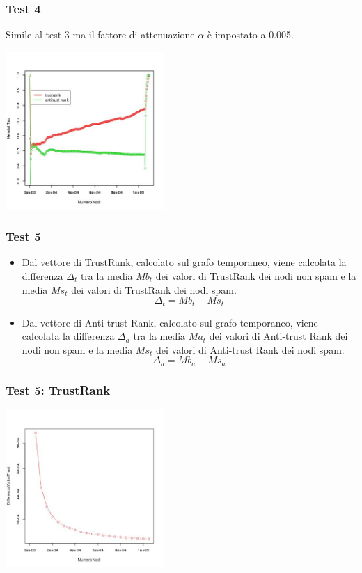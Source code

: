 \documentclass{beamer}
\begin{document}
\begin{frame}
\frametitle{Test 4}
Simile al test 3 ma il fattore di attenuazione \(\alpha\)  è impostato a 0.005.
   \begin{center}
 \includegraphics[height=6cm]{immagini/test4/coplotTrustAnti_Mode1_set3776_62_alpha0005}
\end{center}
\end{frame}
\begin{frame}
\frametitle{Test 5}
\begin{itemize}
 \item Dal vettore di TrustRank,  calcolato sul grafo temporaneo, viene calcolata la differenza \(\Delta_t\) tra la media \(Mb_t\) dei valori di TrustRank dei nodi non spam e la media \(Ms_t\) dei valori di TrustRank dei nodi spam.
 \begin{equation}
 \Delta_t = Mb_t-Ms_t
\end{equation}
  \item Dal vettore di Anti-trust Rank,  calcolato sul grafo temporaneo, viene calcolata la differenza \(\Delta_a\) tra la media \(Ma_t\) dei valori di Anti-trust Rank dei nodi non spam e la media \(Ms_t\) dei valori di Anti-trust Rank dei nodi spam.
  \begin{equation}
 \Delta_a=Mb_a-Ms_a
\end{equation}
\end{itemize}
\end{frame}
\begin{frame}
\frametitle{Test 5: TrustRank}
\begin{center}
 \includegraphics[height=6cm]{immagini/test5/averageTest_trust_62}
\end{center}
\end{frame}
\end{document}
